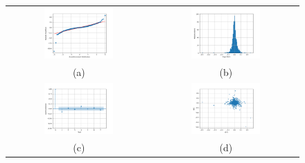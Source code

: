 \documentclass[english,11pt]{article}
\begin{document}
\begin{figure}[p]
    \center
    \begin{tabular}{cc}
    \includegraphics[width=0.5\textwidth]{qq_normal_kraken24h.png} &
    \includegraphics[width=0.5\textwidth]{hist24hreturns_kraken.png} \\
	(a) & (b)\\    
    \includegraphics[width=0.5\textwidth]{acf_kraken.png} & 
    \includegraphics[width=0.5\textwidth]{return_lag_kraken.png}\\
    (c) & (d)\\    

\end{tabular}
\end{figure}
\end{document}
